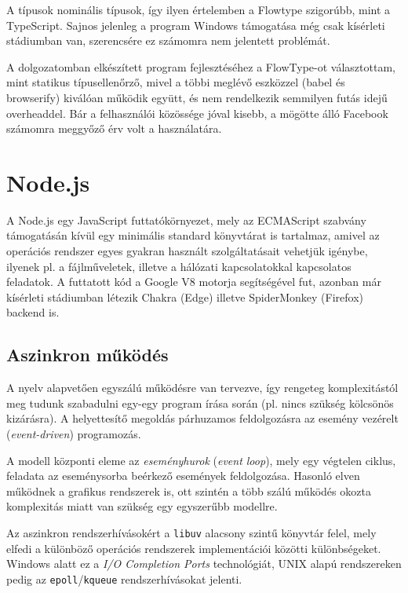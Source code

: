A típusok nominális típusok, így ilyen értelemben a Flowtype szigorúbb, mint a
TypeScript.  Sajnos jelenleg a program Windows támogatása még csak kísérleti
stádiumban van, szerencsére ez számomra nem jelentett problémát.

A dolgozatomban elkészített program fejlesztéséhez a FlowType-ot választottam,
mint statikus típusellenőrző, mivel a többi meglévő eszközzel (babel és
browserify) kiválóan működik együtt, és nem rendelkezik semmilyen futás idejű
overheaddel. Bár a felhasználói közössége jóval kisebb, a mögötte álló Facebook
számomra meggyőző érv volt a használatára.

\section{Node.js}

A Node.js\cite{node} egy JavaScript futtatókörnyezet, mely az ECMAScript
szabvány támogatásán kívül egy minimális standard könyvtárat is tartalmaz,
amivel az operációs rendszer egyes gyakran használt szolgáltatásait vehetjük
igénybe, ilyenek pl. a fájlműveletek, illetve a hálózati kapcsolatokkal
kapcsolatos feladatok.  A futtatott kód a Google V8 motorja segítségével fut,
azonban már kísérleti stádiumban létezik Chakra\cite{nodechakra} (Edge) illetve
SpiderMonkey\cite{spidernode} (Firefox) backend is.

\subsection{Aszinkron működés}

A nyelv alapvetően egyszálú működésre van tervezve, így rengeteg komplexitástól
meg tudunk szabadulni egy-egy program írása során (pl. nincs szükség kölcsönös
kizárásra).  A helyettesítő megoldás párhuzamos feldolgozásra az esemény
vezérelt (\emph{event-driven}) programozás.

A modell központi eleme az \emph{eseményhurok} (\emph{event loop}), mely egy
végtelen ciklus, feladata az eseménysorba beérkező események feldolgozása.
Hasonló elven működnek a grafikus rendszerek is, ott szintén a több szálú
működés okozta komplexitás miatt van szükség egy egyszerűbb modellre.

Az aszinkron rendszerhívásokért a \texttt{libuv}\cite{libuv} alacsony szintű
könyvtár felel, mely elfedi a különböző operációs rendszerek implementációi
közötti különbségeket.  Windows alatt ez a \emph{I/O Completion Ports}
technológiát, UNIX alapú rendszereken pedig az \texttt{epoll}/\texttt{kqueue}
rendszerhívásokat jelenti.

